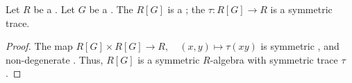 \begin{proposition} \label{proposition:group_algebra_of_a_finite_group_over_a_commutative_ring_is_a_symmetric_algebra_with_symmetric_trace_given_by_the_augmentation_trace}
    Let $R$ be a . Let $G$ be a  . 
    The  $R[G]$ is a ; the  $\tau: R[G] \to R$ is a symmetric trace.
\end{proposition}
\begin{proof}
    The map $R[G] \times R[G] \to R, \quad (x,y) \mapsto \tau(xy)$ is symmetric \TODO{}, and non-degenerate . Thus, $R[G]$ is a symmetric $R$-algebra with symmetric trace $\tau$. 
\end{proof}


